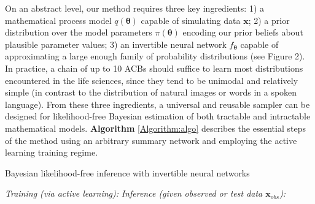 \documentclass[9pt,twoside,lineno]{pnas-new}
\begin{document}
On an abstract level, our method requires three key ingredients: 1) a mathematical process model $q(\boldsymbol{\theta})$ capable of simulating data $\boldsymbol{x}$; 2) a prior distribution over the model parameters $\pi(\boldsymbol{\theta})$ encoding our prior beliefs about plausible parameter values; 3) an invertible neural network $f_{\boldsymbol{\theta}}$ capable of approximating a large enough family of probability distributions (see Figure 2). In practice, a chain of up to 10 ACBs should suffice to learn most distributions encountered in the life sciences, since they tend to be unimodal and relatively simple (in contrast to the distribution of natural images or words in a spoken language). From these three ingredients, a universal and reusable sampler can be designed for likelihood-free Bayesian estimation of both tractable and intractable mathematical models. \textbf{Algorithm} \ref{Algorithm:algo} describes the essential steps of the method using an arbitrary summary network and employing the active learning training regime.

\begin{algorithm}
\caption{Bayesian likelihood-free inference with invertible neural networks}\label{Algorithm:algo}
\begin{algorithmic}[1]
\State \emph{Training (via active learning):}
\Repeat
{}
\State \emph{Inference (given observed or test data $\boldsymbol{x}_{obs}$):}
\EndFor
{}
\end{algorithmic}
\end{algorithm}
\end{document}
